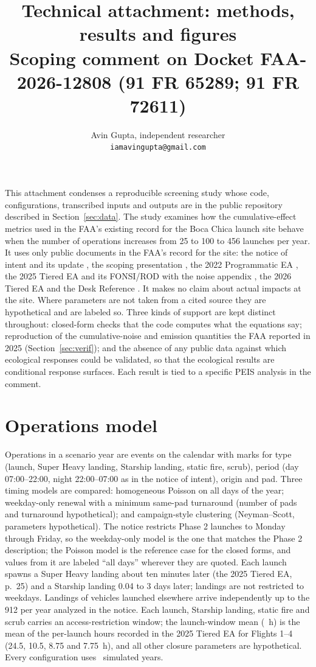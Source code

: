 \documentclass[11pt]{article}
\title{Technical attachment: methods, results and figures\\[4pt]
\large Scoping comment on Docket FAA-2026-12808 (91 FR 65289; 91 FR 72611)}
\author{Avin Gupta, independent researcher\\\texttt{iamavingupta@gmail.com}}
\date{\commentDate}
\begin{document}
\maketitle

\noindent This attachment condenses a reproducible screening study whose code, configurations, transcribed inputs and outputs are in the public repository described in Section~\ref{sec:data}. The study examines how the cumulative-effect metrics used in the FAA's existing record for the Boca Chica launch site behave when the number of operations increases from 25 to 100 to 456 launches per year. It uses only public documents in the FAA's record for the site: the notice of intent and its update \citep{noi2026,noiupdate2026}, the scoping presentation \citep{scoping2026}, the 2022 Programmatic EA \citep{pea2022}, the 2025 Tiered EA and its FONSI/ROD \citep{tieredea2025,fonsi2025} with the noise appendix \citep{appendixb2025}, the 2026 Tiered EA \citep{rtlsea2026} and the Desk Reference \citep{deskref2020}. It makes no claim about actual impacts at the site. Where parameters are not taken from a cited source they are hypothetical and are labeled so. Three kinds of support are kept distinct throughout: closed-form checks that the code computes what the equations say; reproduction of the cumulative-noise and emission quantities the FAA reported in 2025 (Section~\ref{sec:verif}); and the absence of any public data against which ecological responses could be validated, so that the ecological results are conditional response surfaces. Each result is tied to a specific PEIS analysis in the comment.

\section{Operations model}

Operations in a scenario year are events on the calendar with marks for type (launch, Super Heavy landing, Starship landing, static fire, scrub), period (day 07:00--22:00, night 22:00--07:00 as in the notice of intent), origin and pad. Three timing models are compared: homogeneous Poisson on all days of the year; weekday-only renewal with a minimum same-pad turnaround (number of pads and turnaround hypothetical); and campaign-style clustering (Neyman--Scott, parameters hypothetical). The notice restricts Phase 2 launches to Monday through Friday, so the weekday-only model is the one that matches the Phase 2 description; the Poisson model is the reference case for the closed forms, and values from it are labeled ``all days'' wherever they are quoted. Each launch spawns a Super Heavy landing about ten minutes later (the 2025 Tiered EA, p.~25) and a Starship landing 0.04 to 3 days later; landings are not restricted to weekdays. Landings of vehicles launched elsewhere arrive independently up to the 912 per year analyzed in the notice. Each launch, Starship landing, static fire and scrub carries an access-restriction window; the launch-window mean (\valRecordMeanLaunchClosureH~h) is the mean of the per-launch hours recorded in the 2025 Tiered EA for Flights 1--4 (24.5, 10.5, 8.75 and 7.75~h), and all other closure parameters are hypothetical. Every configuration uses \valMcNRealizations~simulated years.
\end{document}

